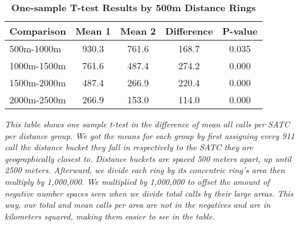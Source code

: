 \begin{table}[htbp]
\centering
\begin{tabular}{l|c c c c}
\hline
Comparison & Mean 1 & Mean 2 & Difference & P-value \\
\hline
500m-1000m & 930.3 & 761.6 & 168.7 & 0.035 \\
1000m-1500m & 761.6 & 487.4 & 274.2 & 0.000 \\
1500m-2000m & 487.4 & 266.9 & 220.4 & 0.000 \\
2000m-2500m & 266.9 & 153.0 & 114.0 & 0.000 \\
\hline
\end{tabular}
\caption{\textbf{One-sample T-test Results by 500m Distance Rings}}
\label{tab:ttests2}
\centering\textit{This table shows one sample t-test in the difference of mean all calls per SATC per distance group. We got the means for each group by first assigning every 911 call the distance bucket they fall in respectively to the SATC they are geographically closest to. Distance buckets are spaced 500 meters apart, up until 2500 meters. Afterward, we divide each ring by its concentric ring's area then multiply by 1,000,000. We multiplied by 1,000,000 to offset the amount of negative number spaces seen when we divide total calls by their large areas. This way, our total and mean calls per area are not in the negatives and are in kilometers squared, making them easier to see in the table.}
\end{table}
